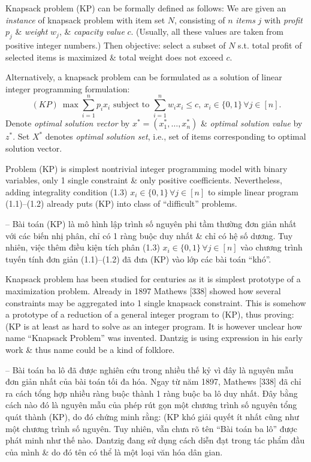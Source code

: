 \documentclass{article}
\begin{document}
\begin{itemize}
\begin{itemize}
        Knapsack problem (KP) can be formally defined as follows: We are given an {\it instance} of knapsack problem with item set $N$, consisting of $n$ {\it items} $j$ with {\it profit} $p_j$ \& {\it weight} $w_j$, \& {\it capacity value} $c$. (Usually, all these values are taken from positive integer numbers.) Then objective: select a subset of $N$ s.t. total profit of selected items is maximized \& total weight does not exceed $c$.
        
        Alternatively, a knapsack problem can be formulated as a solution of linear integer programming formulation:
        \begin{equation*}
            (KP)\ \max\sum_{i=1}^n p_ix_i\mbox{ subject to }\sum_{i=1}^n w_ix_i\le c,\ x_i\in\{0,1\}\,\forall j\in[n].
        \end{equation*}
        Denote {\it optimal solution vector} by $x^* = (x_1^*,\ldots,x_n^*)$ \& {\it optimal solution value} by $z^*$. Set $X^*$ denotes {\it optimal solution set}, i.e., set of items corresponding to optimal solution vector.
        
        Problem (KP) is simplest nontrivial integer programming model with binary variables, only 1 single constraint \& only positive coefficients. Nevertheless, adding integrality condition (1.3) $x_i\in\{0,1\}\,\forall j\in[n]$ to simple linear program (1.1)--(1.2) already puts (KP) into class of ``difficult'' problems.
        
        -- Bài toán (KP) là mô hình lập trình số nguyên phi tầm thường đơn giản nhất với các biến nhị phân, chỉ có 1 ràng buộc duy nhất \& chỉ có hệ số dương. Tuy nhiên, việc thêm điều kiện tích phân (1.3) $x_i\in\{0,1\}\,\forall j\in[n]$ vào chương trình tuyến tính đơn giản (1.1)--(1.2) đã đưa (KP) vào lớp các bài toán ``khó''.
        
        Knapsack problem has been studied for centuries as it is simplest prototype of a maximization problem. Already in 1897 Mathews [338] showed how several constraints may be aggregated into 1 single knapsack constraint. This is somehow a prototype of a reduction of a general integer program to (KP), thus proving: (KP is at least as hard to solve as an integer program. It is however unclear how name ``Knapsack Problem''  was invented. {\sc Dantzig} is using expression in his early work \& thus name could be a kind of folklore.
        
        -- Bài toán ba lô đã được nghiên cứu trong nhiều thế kỷ vì đây là nguyên mẫu đơn giản nhất của bài toán tối đa hóa. Ngay từ năm 1897, Mathews [338] đã chỉ ra cách tổng hợp nhiều ràng buộc thành 1 ràng buộc ba lô duy nhất. Đây bằng cách nào đó là nguyên mẫu của phép rút gọn một chương trình số nguyên tổng quát thành (KP), do đó chứng minh rằng: (KP khó giải quyết ít nhất cũng như một chương trình số nguyên. Tuy nhiên, vẫn chưa rõ tên ``Bài toán ba lô'' được phát minh như thế nào. {\sc Dantzig} đang sử dụng cách diễn đạt trong tác phẩm đầu của mình \& do đó tên có thể là một loại văn hóa dân gian.
        

\end{itemize}
\end{itemize}
\end{document}
